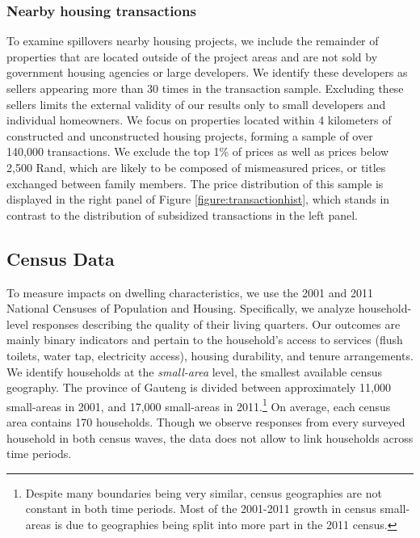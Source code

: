 \documentclass[12pt]{article}
\begin{document}
\subsubsection*{Nearby housing transactions}

To examine spillovers nearby housing projects, we include the remainder of properties that are located outside of the project areas and are not sold by government housing agencies or large developers.  We identify these developers as sellers appearing more than 30 times in the transaction sample.  Excluding these sellers limits the external validity of our results only to small developers and individual homeowners.  We focus on properties located within 4 kilometers of constructed and unconstructed housing projects, forming a sample of over 140,000 transactions.  We exclude the top 1\% of prices as well as prices below 2,500 Rand, which are likely to be composed of mismeasured prices, or titles exchanged between family members. The price distribution of this sample is displayed in the right panel of Figure \ref{figure:transactionhist}, which stands in contrast to the distribution of subsidized transactions in the left panel. 

\subsection{Census Data}

To measure impacts on dwelling characteristics, we use the 2001 and 2011 National Censuses of Population and Housing. Specifically, we analyze household-level responses describing the quality of their living quarters. Our outcomes are mainly binary indicators and pertain to the household's access to services (flush toilets, water tap, electricity access), housing durability, and tenure arrangements. We identify households at the {\it small-area} level, the smallest available census geography. The province of Gauteng is divided between approximately 11,000 small-areas in 2001, and 17,000 small-areas in 2011.\footnote{Despite many boundaries being very similar, census geographies are not constant in both time periods. Most of the 2001-2011 growth in census small-areas is due to geographies being split into more part in the 2011 census.} On average, each census area contains 170 households. Though we observe responses from every surveyed household in both census waves, the data does not allow to link households across time periods. 
\end{document}
